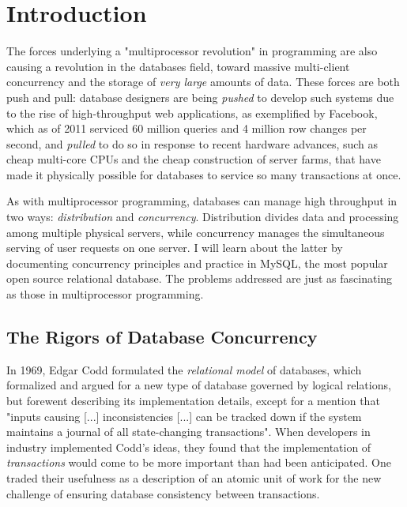 \documentclass[12pt]{article} %
\begin{document}
\tableofcontents %

\newpage %


\section{Introduction} %
The forces underlying a "multiprocessor revolution" in programming are also causing a revolution in the databases field, toward massive multi-client concurrency and the storage of \textit{very large} amounts of data. These forces are both push and pull: database designers are being \textit{pushed} to develop such systems due to the rise of high-throughput web applications, as exemplified by Facebook, which as of 2011 serviced 60 million queries and 4 million row changes per second, and \textit{pulled} to do so in response to recent hardware advances, such as cheap multi-core CPUs and the cheap construction of server farms, that have made it physically possible for databases to service so many transactions at once.

As with multiprocessor programming, databases can manage high throughput in two ways: \textit{distribution} and \textit{concurrency}. Distribution divides data and processing among multiple physical servers, while concurrency manages the simultaneous serving of user requests on one server.  I will learn about the latter by documenting concurrency principles and practice in MySQL, the most popular open source relational database. The problems addressed are just as fascinating as those in multiprocessor programming.

\subsection{The Rigors of Database Concurrency} %

In 1969, Edgar Codd formulated the \textit{relational model} of databases, which formalized and argued for a new type of database governed by logical relations, but forewent describing its implementation details, except for a mention that "inputs causing [...] inconsistencies [...] can be tracked down if the system maintains a journal of all state-changing transactions". When developers in industry implemented Codd's ideas, they found that the implementation of \textit{transactions} would come to be more important than had been anticipated. One traded their usefulness as a description of an atomic unit of work for the new challenge of ensuring database consistency between transactions.
\end{document}
